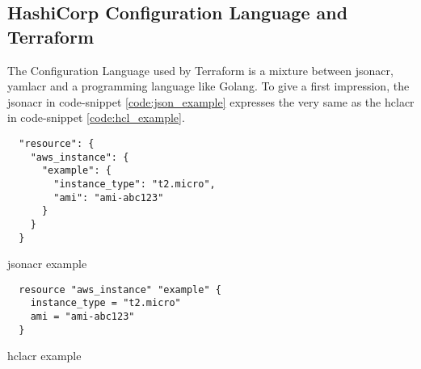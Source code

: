\subsection{HashiCorp Configuration Language and Terraform}
The Configuration Language used by Terraform is a mixture between \gls{jsonacr}, \gls{yamlacr} and a programming language like Golang.
To give a first impression, the \gls{jsonacr} in code-snippet \ref{code:json_example} expresses the very same as the \gls{hclacr} in code-snippet \ref{code:hcl_example}.

\begin{listing}[H]\begin{addmargin}[2em]{2em}\begin{verbatim}
  "resource": {
    "aws_instance": {
      "example": {
        "instance_type": "t2.micro",
        "ami": "ami-abc123"
      }
    }
  }
  \end{verbatim}
  \caption{\gls{jsonacr} example}
  \label{code:json_example}
  \end{addmargin}
\end{listing}

\begin{listing}[H]\begin{addmargin}[2em]{2em}\begin{verbatim}
  resource "aws_instance" "example" {
    instance_type = "t2.micro"
    ami = "ami-abc123"
  }
  \end{verbatim}
  \caption{\gls{hclacr} example}
  \label{code:hcl_example}
  \end{addmargin}
\end{listing}


